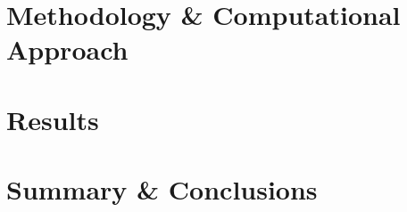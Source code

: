 \documentclass[12pt, oneside]{book}
\begin{document}
 
  

 
 
% 


\part{Methodology \& Computational Approach}




\part{Results}




\part{Summary \& Conclusions}



\appendix           %
\end{document}
